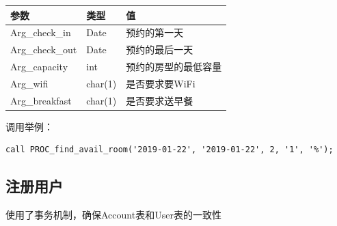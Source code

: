 \documentclass[]{article}
\begin{document}
\begin{longtable}[]{@{}lll@{}}
\toprule
参数 & 类型 & 值\tabularnewline
\midrule
\endhead
Arg\_check\_in & Date & 预约的第一天\tabularnewline
Arg\_check\_out & Date & 预约的最后一天\tabularnewline
Arg\_capacity & int & 预约的房型的最低容量\tabularnewline
Arg\_wifi & char(1) & 是否要求要WiFi\tabularnewline
Arg\_breakfast & char(1) & 是否要求送早餐\tabularnewline
\bottomrule
\end{longtable}

调用举例：

\begin{verbatim}
call PROC_find_avail_room('2019-01-22', '2019-01-22', 2, '1', '%');
\end{verbatim}

\hypertarget{ux6ce8ux518cux7528ux6237}{%
\subsection{注册用户}\label{ux6ce8ux518cux7528ux6237}}

使用了事务机制，确保Account表和User表的一致性

\begin{Shaded}
\begin{Highlighting}[]
 
\NormalTok{  (}\NormalTok{(}\NormalTok{), }\NormalTok{(}\NormalTok{), }\NormalTok{(}\NormalTok{), }\NormalTok{(}\NormalTok{))}
    \NormalTok{ ;}
     \NormalTok{ ;}
     \NormalTok{) } 
      \NormalTok{(}
      \OperatorTok{+} \NormalTok{, }\NormalTok{, }\NormalTok{, }\NormalTok{, }\NormalTok{);}
      \NormalTok{(}\NormalTok{, }\NormalTok{)}
      \OperatorTok{+} \NormalTok{);}
    \NormalTok{;}
  \NormalTok{;}
\end{Highlighting}
\end{Shaded}
\end{document}
